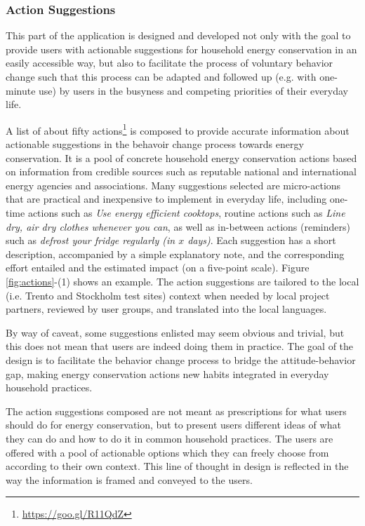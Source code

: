 
\subsubsection{Action Suggestions}

This part of the application is designed and developed not only with the goal to provide users with actionable suggestions for household energy conservation in an easily accessible way, but also to facilitate the process of voluntary behavior change such that this process can be adapted and followed up (e.g. with one-minute use) by users in the busyness and competing priorities of their everyday life. 

A list of about fifty actions\footnote{\url{https://goo.gl/R11QdZ}} is composed to provide accurate information about actionable suggestions in the behavoir change process towards energy conservation. It is a pool of concrete household energy conservation actions based on information from credible sources such as reputable national and international energy agencies and associations. Many suggestions selected are micro-actions that are practical and inexpensive to implement in everyday life, including one-time actions such as \textit{Use energy efficient cooktops}, routine actions such as \textit{Line dry, air dry clothes whenever you can}, as well as in-between actions (reminders) such as \textit{defrost your fridge regularly (in $x$ days)}. Each suggestion has a short description, accompanied by a simple explanatory note, and the corresponding effort entailed and the estimated impact (on a five-point scale). Figure \ref{fig:actions}-(1) shows an example. The action suggestions are tailored to the local (i.e. Trento and Stockholm test sites) context when needed by local project partners, reviewed by user groups, and translated into the local languages. 

By way of caveat, some suggestions enlisted may seem obvious and trivial, but this does not mean that users are indeed doing them in practice. The goal of the design is to facilitate the behavior change process to bridge the attitude-behavior gap, making energy conservation actions new habits integrated in everyday household practices. 

The action suggestions composed are not meant as prescriptions for what users should do for energy conservation, but to present users different ideas of what they can do and how to do it in common household practices. The users are offered with a pool of actionable options which they can freely choose from according to their own context. This line of thought in design is reflected in the way the information is framed and conveyed to the users. 

